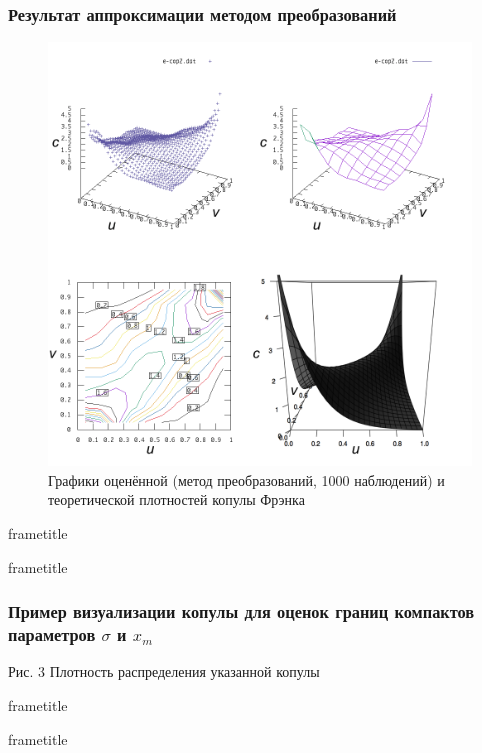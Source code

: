 \documentclass[11pt]{beamer}
\begin{document}
\begin{frame}
\begin{center}
\frametitle{Результат аппроксимации методом преобразований}
\begin{figure}[H]
  \centering
  \includegraphics[width=.56\textwidth]{FrankTransform.png}
  \caption{Графики оценённой (метод преобразований, 1000 наблюдений) и теоретической плотностей копулы Фрэнка}
\end{figure}
\end{center}
\end{frame}

{
  \nointerlineskip
  \begin{beamercolorbox}[wd=\paperwidth,leftskip=0.3cm,rightskip=0.3cm,ht=5.5ex,dp=1.5ex]{frametitle}
    \scshape \protect\insertframetitle%
  \end{beamercolorbox}%

  \if@useTitleProgressBar
    \nointerlineskip
    \begin{beamercolorbox}[wd=\paperwidth,ht=0.4pt,dp=0pt]{frametitle}
      \progressbar{\paperwidth}
    \end{beamercolorbox}
  \fi
}
\makeatother

\begin{frame}
\begin{center}
\frametitle{Пример визуализации копулы для оценок границ компактов параметров $\sigma$ и $x_m$}
\resizebox{\columnwidth}{!}{}
{\small Рис. 3 Плотность распределения указанной копулы}
\end{center}
\end{frame}

{
  \nointerlineskip
  \begin{beamercolorbox}[wd=\paperwidth,leftskip=0.3cm,rightskip=0.3cm,ht=2.5ex,dp=1.5ex]{frametitle}
    \scshape \protect\insertframetitle%
  \end{beamercolorbox}%

  \if@useTitleProgressBar
    \nointerlineskip
    \begin{beamercolorbox}[wd=\paperwidth,ht=0.4pt,dp=0pt]{frametitle}
      \progressbar{\paperwidth}
    \end{beamercolorbox}
  \fi
}
\makeatother
\end{document}
